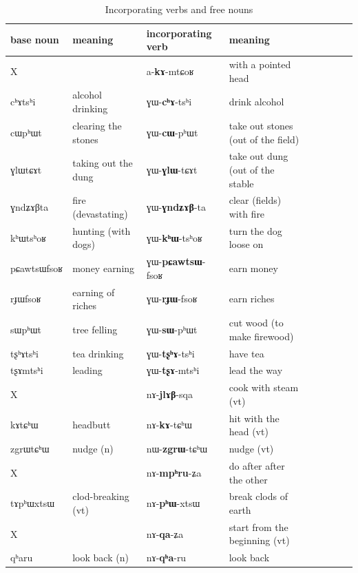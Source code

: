 \documentclass[oldfontcommands,oneside,a4paper,11pt]{article}
\newcommand{\ipa}[1]{{\phon #1}} %
\begin{document}
  \begin{table}[H]
  \caption{Incorporating verbs and free nouns}\label{tab:incorp.japhug2}
\begin{tabular}{lllllllll}

   \toprule
base noun & meaning   & incorporating verb & meaning \\
\midrule
X & & \ipa{a-\textbf{kɤ}-mtɕoʁ} & with a pointed head \\
 \ipa{cʰɤtsʰi} &alcohol drinking & \ipa{ɣɯ-\textbf{cʰɤ}-tsʰi } & drink alcohol\\
  \ipa{cɯpʰɯt} & clearing the stones& \ipa{ ɣɯ-\textbf{cɯ}-pʰɯt } & take out stones (out of the field)\\
   \ipa{ɣlɯtɕɤt} & taking out the dung & \ipa{ɣɯ-\textbf{ɣlɯ}-tɕɤt} & take out dung (out of the stable \\

  \ipa{ɣndʑɤβta} & fire (devastating)& \ipa{ɣɯ-\textbf{ɣndʑɤβ}-ta} & clear (fields) with fire  \\
  \ipa{kʰɯtsʰoʁ} & hunting (with dogs) & \ipa{ɣɯ-\textbf{kʰɯ}-tsʰoʁ} & turn the dog loose on   \\
  \ipa{pɕawtsɯfsoʁ} & money earning& \ipa{ɣɯ-\textbf{pɕawtsɯ}-fsoʁ} & earn money  \\
    \ipa{rɟɯfsoʁ} &  earning of riches & \ipa{ɣɯ-\textbf{rɟɯ}-fsoʁ} & earn riches  \\
  \ipa{sɯpʰɯt} & tree felling &   \ipa{ɣɯ-\textbf{sɯ}-pʰɯt} & cut wood (to make firewood) \\
  \ipa{tʂʰɤtsʰi} & tea drinking & \ipa{ɣɯ-\textbf{tʂʰɤ}-tsʰi} & have tea  \\
  \ipa{tʂɤmtsʰi} & leading & \ipa{ɣɯ-\textbf{tʂɤ}-mtsʰi} & lead the way  \\
X && \ipa{nɤ-\textbf{jlɤβ}-sqa} & cook with steam  (vt) \\
  
  \ipa{kɤtɕʰɯ} &   headbutt  & \ipa{nɤ-\textbf{kɤ}-tɕʰɯ} & hit with the head (vt)  \\
    \ipa{zgrɯtɕʰɯ} & nudge (n)  & \ipa{nɯ-\textbf{zgrɯ}-tɕʰɯ} & nudge (vt)  \\
X && \ipa{nɤ-\textbf{mpʰru}-ʑa} & do after after the other  \\
  \ipa{tɤpʰɯxtsɯ} & clod-breaking (vt)& \ipa{nɤ-\textbf{pʰɯ}-xtsɯ} & break clods of earth  \\
X &&\ipa{nɤ-\textbf{qa}-ʑa} & start from the beginning (vt)  \\
  \ipa{qʰaru} & look back (n) & \ipa{nɤ-\textbf{qʰa}-ru} & look back  \\


\end{tabular}
\end{table}
\end{document}

